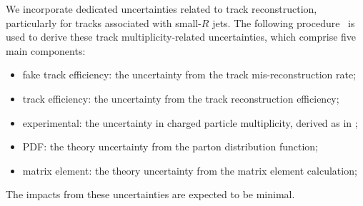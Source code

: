 \label{subsec:tracks_uncer}
We incorporate dedicated uncertainties related to track reconstruction, particularly for tracks associated with small-$R$ jets.
The following procedure~\cite{ATL-PHYS-PUB-2017-009} is used to derive these track multiplicity-related uncertainties, which comprise five main components:
\begin{itemize}
    \item fake track efficiency: the uncertainty from the track mis-reconstruction rate;
    \item track efficiency: the uncertainty from the track reconstruction efficiency;
    \item experimental: the uncertainty in charged particle multiplicity, derived as in \cite{CERN-PH-EP-2016-001};
    \item PDF: the theory uncertainty from the parton distribution function;
    \item matrix element: the theory uncertainty from the matrix element calculation;
\end{itemize}
The impacts from these uncertainties are expected to be minimal.


